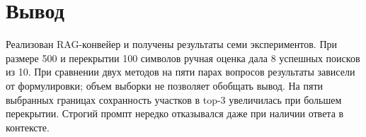 \documentclass[12pt,a4paper]{article}
\begin{document}
\enlargethispage{3\baselineskip}
\section{Вывод}
Реализован RAG-конвейер и получены результаты семи экспериментов. При размере 500 и перекрытии 100 символов ручная оценка дала 8 успешных поисков из 10. При сравнении двух методов на пяти парах вопросов результаты зависели от формулировки; объем выборки не позволяет обобщать вывод. На пяти выбранных границах сохранность участков в top-3 увеличилась при большем перекрытии. Строгий промпт нередко отказывался даже при наличии ответа в контексте.
\end{document}
